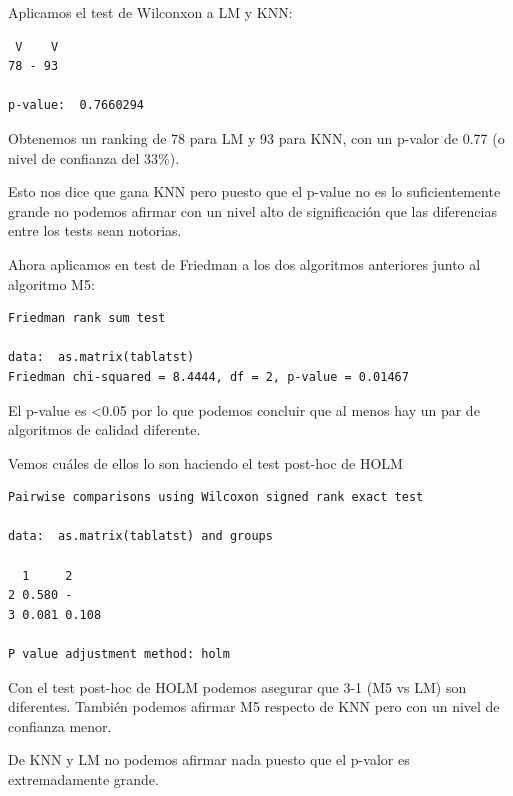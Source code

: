 \vspace{\baselineskip}

Aplicamos el test de Wilconxon a LM y KNN:
\begin{verbatim}
 V    V
78 - 93 

p-value:  0.7660294
\end{verbatim}

Obtenemos un ranking de 78 para LM y 93 para KNN, con un p-valor de 0.77 (o nivel de confianza del 33\%).

Esto nos dice que gana KNN pero puesto que el p-value no es lo suficientemente grande no podemos afirmar con un nivel alto de significación que las diferencias entre los tests sean notorias.

\vspace{\baselineskip}

Ahora aplicamos en test de Friedman a los dos algoritmos anteriores junto al algoritmo M5:
\begin{verbatim}
Friedman rank sum test

data:  as.matrix(tablatst)
Friedman chi-squared = 8.4444, df = 2, p-value = 0.01467
\end{verbatim}

El p-value es \textless0.05 por lo que podemos concluir que al menos hay un par de algoritmos de calidad diferente.

\vspace{\baselineskip}

Vemos cuáles de ellos lo son haciendo el test post-hoc de HOLM
\begin{verbatim}
Pairwise comparisons using Wilcoxon signed rank exact test 

data:  as.matrix(tablatst) and groups 

  1     2    
2 0.580 -    
3 0.081 0.108

P value adjustment method: holm 
\end{verbatim}

Con el test post-hoc de HOLM podemos asegurar que 3-1 (M5 vs LM) son diferentes. También podemos afirmar M5 respecto de KNN pero con un nivel de confianza menor.

\vspace{\baselineskip}

De KNN y LM no podemos afirmar nada puesto que el p-valor es extremadamente grande.